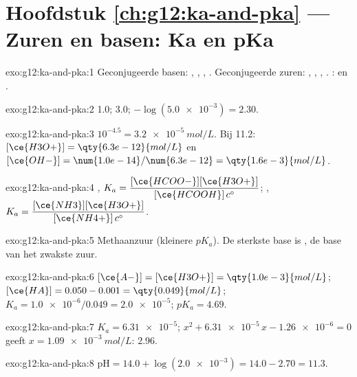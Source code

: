\section*{Hoofdstuk \ref{ch:g12:ka-and-pka} --- Zuren en basen: Ka en pKa}

\begin{solution}{exo:g12:ka-and-pka:1}
Geconjugeerde basen: , , , .
Geconjugeerde zuren: , , , .
:  en .
\end{solution}

\begin{solution}{exo:g12:ka-and-pka:2}
 1.0; 3.0; $-\log(\num{5.0e-3}) = 2.30$.
\end{solution}

\begin{solution}{exo:g12:ka-and-pka:3}
$10^{-4.5} = \qty{3.2e-5}{mol/L}$. Bij  11.2:
$[\ce{H3O+}] = \qty{6.3e-12}{mol/L}$ en
$[\ce{OH-}] = \num{1.0e-14}/\num{6.3e-12} = \qty{1.6e-3}{mol/L}$.
\end{solution}

\begin{solution}{exo:g12:ka-and-pka:4}
,
$K_a = \dfrac{[\ce{HCOO-}][\ce{H3O+}]}{[\ce{HCOOH}]\,c^\circ}$;
,
$K_a = \dfrac{[\ce{NH3}][\ce{H3O+}]}{[\ce{NH4+}]\,c^\circ}$.
\end{solution}

\begin{solution}{exo:g12:ka-and-pka:5}
Methaanzuur (kleinere $pK_a$). De sterkste base is , de base
van het zwakste zuur.
\end{solution}

\begin{solution}{exo:g12:ka-and-pka:6}
$[\ce{A-}] = [\ce{H3O+}] = \qty{1.0e-3}{mol/L}$;
$[\ce{HA}] = 0.050 - 0.001 = \qty{0.049}{mol/L}$;
$K_a = \num{1.0e-6}/0.049 = \num{2.0e-5}$; $pK_a = 4.69$.
\end{solution}

\begin{solution}{exo:g12:ka-and-pka:7}
$K_a = \num{6.31e-5}$; $x^2 + \num{6.31e-5}\,x - \num{1.26e-6} = 0$ geeft
$x = \qty{1.09e-3}{mol/L}$:  2.96.
\end{solution}

\begin{solution}{exo:g12:ka-and-pka:8}
$\mathrm{pH} = 14.0 + \log(\num{2.0e-3}) = 14.0 - 2.70 = 11.3$.
\end{solution}

